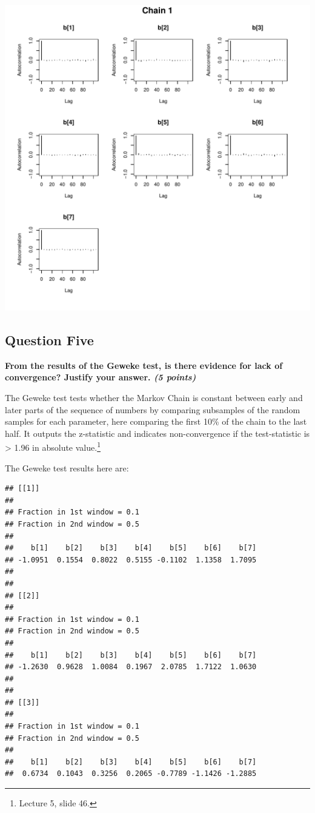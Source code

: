 \documentclass[
  11pt,
]{article}
\begin{document}
\includegraphics{ACF_LogisticReg.pdf}

\pagebreak

\hypertarget{question-five}{%
\subsection{Question Five}\label{question-five}}

\textbf{From the results of the Geweke test, is there evidence for lack of convergence? Justify your answer. \textit{(5 points)}}

The Geweke test tests whether the Markov Chain is constant between early
and later parts of the sequence of numbers by comparing subsamples of
the random samples for each parameter, here comparing the first 10\% of
the chain to the last half. It outputs the z-statistic and indicates
non-convergence if the test-statistic is \textgreater{} 1.96 in absolute
value.\footnote{Lecture 5, slide 46.}

The Geweke test results here are:

\begin{verbatim}
## [[1]]
## 
## Fraction in 1st window = 0.1
## Fraction in 2nd window = 0.5 
## 
##    b[1]    b[2]    b[3]    b[4]    b[5]    b[6]    b[7] 
## -1.0951  0.1554  0.8022  0.5155 -0.1102  1.1358  1.7095 
## 
## 
## [[2]]
## 
## Fraction in 1st window = 0.1
## Fraction in 2nd window = 0.5 
## 
##    b[1]    b[2]    b[3]    b[4]    b[5]    b[6]    b[7] 
## -1.2630  0.9628  1.0084  0.1967  2.0785  1.7122  1.0630 
## 
## 
## [[3]]
## 
## Fraction in 1st window = 0.1
## Fraction in 2nd window = 0.5 
## 
##    b[1]    b[2]    b[3]    b[4]    b[5]    b[6]    b[7] 
##  0.6734  0.1043  0.3256  0.2065 -0.7789 -1.1426 -1.2885
\end{verbatim}
\end{document}
